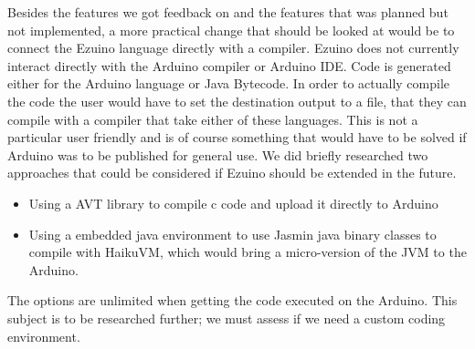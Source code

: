 Besides the features we got feedback on and the features that was planned but not implemented, a more practical change that should be looked at would be to connect the Ezuino language directly with a compiler. Ezuino does not currently interact directly with the Arduino compiler or Arduino IDE. Code is generated either for the Arduino language or Java Bytecode. In order to actually compile the code the user would have to set the destination output to a file, that they can compile with a compiler that take either of these languages. This is not a particular user friendly and is of course something that would have to be solved if Arduino was to be published for general use. We did briefly researched two approaches that could be considered if Ezuino should be extended in the future.
\begin{itemize}
    \item Using a AVT library to compile c code and upload it directly to Arduino
    \item Using a embedded java environment to use Jasmin java binary classes to compile with HaikuVM\cite{haiku}, which would bring a micro-version of the JVM to the Arduino.
\end{itemize}
The options are unlimited when getting the code executed on the Arduino. This subject is to be researched further; we must assess if we need a custom coding environment.



\iffalse
Besides those 



, being easier to was preferable as an additional option to arrays.

using the feedback from the user test; better type names, weak typing at least so int can be written in double types
dynamic arrays or as we called them list
\\\\
things we didnt generally have time for:

string concatenation in the Arduiono C code generator
records / structs are very useful for various tasks in arduino. For example to define data types related to whether when working with whether
parsing library. So string for example can be parsed to other data types.
\fi

